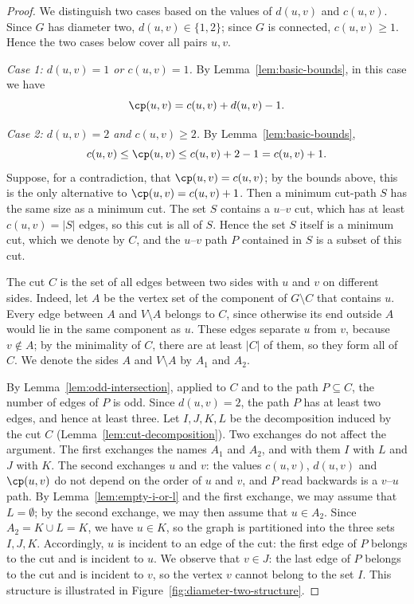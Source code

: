 \begin{proof}
We distinguish two cases based on the values of $d(u, v)$ and $c(u, v)$.
Since $G$ has diameter two, $d(u, v) \in \{1, 2\}$; since $G$ is connected, $c(u, v) \geq 1$.
Hence the two cases below cover all pairs $u, v$.

\emph{Case 1: $d(u, v) = 1$ or $c(u, v) = 1$.}
By Lemma~\ref{lem:basic-bounds}, in this case we have
\[
\cp(u, v) = c(u, v) + d(u, v) - 1.
\]

\emph{Case 2: $d(u, v) = 2$ and $c(u, v) \geq 2$.}
By Lemma~\ref{lem:basic-bounds},
\[
c(u, v) \leq \cp(u, v) \leq c(u, v) + 2 - 1 = c(u, v) + 1.
\]
Suppose, for a contradiction, that $\cp(u, v) = c(u, v)$; by the bounds above, this is the only alternative to $\cp(u, v) = c(u, v) + 1$.
Then a minimum cut-path $S$ has the same size as a minimum cut.
The set $S$ contains a $u$--$v$ cut, which has at least $c(u, v) = |S|$ edges, so this cut is all of $S$.
Hence the set $S$ itself is a minimum cut, which we denote by $C$, and the $u$--$v$ path $P$ contained in $S$ is a subset of this cut.

The cut $C$ is the set of all edges between two sides with $u$ and $v$ on different sides.
Indeed, let $A$ be the vertex set of the component of $G \setminus C$ that contains $u$.
Every edge between $A$ and $V \setminus A$ belongs to $C$, since otherwise its end outside $A$ would lie in the same component as $u$.
These edges separate $u$ from $v$, because $v \notin A$; by the minimality of $C$, there are at least $|C|$ of them, so they form all of $C$.
We denote the sides $A$ and $V \setminus A$ by $A_1$ and $A_2$.

By Lemma~\ref{lem:odd-intersection}, applied to $C$ and to the path $P \subseteq C$, the number of edges of $P$ is odd.
Since $d(u,v) = 2$, the path $P$ has at least two edges, and hence at least three.
Let $I, J, K, L$ be the decomposition induced by the cut $C$ (Lemma~\ref{lem:cut-decomposition}).
Two exchanges do not affect the argument.
The first exchanges the names $A_1$ and $A_2$, and with them $I$ with $L$ and $J$ with $K$.
The second exchanges $u$ and $v$: the values $c(u, v)$, $d(u, v)$ and $\cp(u, v)$ do not depend on the order of $u$ and $v$, and $P$ read backwards is a $v$--$u$ path.
By Lemma~\ref{lem:empty-i-or-l} and the first exchange, we may assume that $L = \emptyset$; by the second exchange, we may then assume that $u \in A_2$.
Since $A_2 = K \cup L = K$, we have $u \in K$, so the graph is partitioned into the three sets $I, J, K$.
Accordingly, $u$ is incident to an edge of the cut: the first edge of $P$ belongs to the cut and is incident to $u$.
We observe that $v \in J$: the last edge of $P$ belongs to the cut and is incident to $v$, so the vertex $v$ cannot belong to the set $I$.
This structure is illustrated in Figure~\ref{fig:diameter-two-structure}.


\end{proof}
